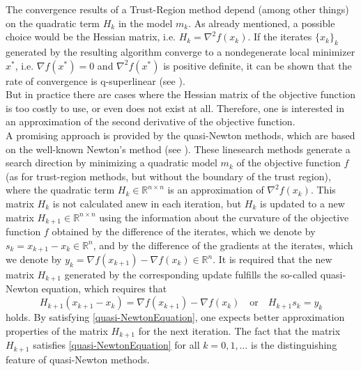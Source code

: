 The convergence results of a Trust-Region method depend (among other things) on the quadratic term $H_k$ in the model $m_k$. As already mentioned, a possible choice would be the Hessian matrix, i.e. $H_k = \nabla^2 f(x_k)$. If the iterates $\{ x_k \}_k$ generated by the resulting algorithm converge to a nondegenerate local minimizer $x^*$, i.e. $\nabla f(x^*) = 0$ and $\nabla^2 f(x^*)$ is positive definite, it can be shown that the rate of convergence is q-superlinear (see \cite[4.4~Local~convergence~of~trust-region~Newton~methods]{NocedalWright:2006}). \\
But in practice there are cases where the Hessian matrix of the objective function is too costly to use, or even does not exist at all. Therefore, one is interested in an approximation of the second derivative of the objective function. \\
A promising approach is provided by the quasi-Newton methods, which are based on the well-known Newton's method (see \cite[Chapter~6]{NocedalWright:2006}). These linesearch methods generate a search direction by minimizing a quadratic model $m_k$ of the objective function $f$ (as for trust-region methods, but without the boundary of the trust region), where the quadratic term $H_k \in \mathbb{R}^{n \times n}$ is an approximation of $\nabla^{2} f(x_k)$. This matrix $H_k$ is not calculated anew in each iteration, but $H_k$ is updated to a new matrix $H_{k+1} \in \mathbb{R}^{n \times n}$ using the information about the curvature of the objective function $f$ obtained by the difference of the iterates, which we denote by $s_k = x_{k+1} - x_k \in \mathbb{R}^n$, and by the difference of the gradients at the iterates, which we denote by $y_k = \nabla f(x_{k+1}) - \nabla f(x_k) \in \mathbb{R}^n$. It is required that the new matrix $H_{k+1}$ generated by the corresponding update fulfills the so-called quasi-Newton equation, which requires that
\begin{equation}\label{quasi-NewtonEquation}
    H_{k+1} (x_{k+1} - x_k) = \nabla f(x_{k+1}) - \nabla f(x_k) \quad \text{or} \quad H_{k+1} s_k = y_k
\end{equation}
holds. By satisfying \cref{quasi-NewtonEquation}, one expects better approximation properties of the matrix $H_{k+1}$ for the next iteration. The fact that the matrix $H_{k+1}$ satisfies \cref{quasi-NewtonEquation} for all $k = 0, 1, \ldots$ is the distinguishing feature of quasi-Newton methods. \\

